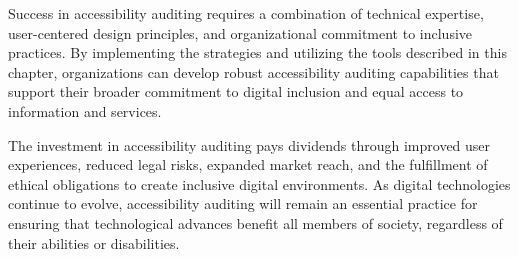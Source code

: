 Success in accessibility auditing requires a combination of technical expertise, user-centered design principles, and organizational commitment to inclusive practices. By implementing the strategies and utilizing the tools described in this chapter, organizations can develop robust accessibility auditing capabilities that support their broader commitment to digital inclusion and equal access to information and services.

The investment in accessibility auditing pays dividends through improved user experiences, reduced legal risks, expanded market reach, and the fulfillment of ethical obligations to create inclusive digital environments. As digital technologies continue to evolve, accessibility auditing will remain an essential practice for ensuring that technological advances benefit all members of society, regardless of their abilities or disabilities.

